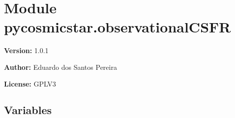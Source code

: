 %
%
%


\section{Module pycosmicstar.observationalCSFR}

    \label{pycosmicstar:observationalCSFR}
\textbf{Version:} 1.0.1



\textbf{Author:} Eduardo dos Santos Pereira



\textbf{License:} GPLV3





  \subsection{Variables}

